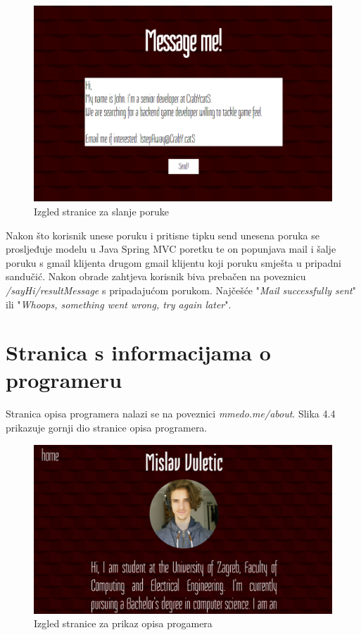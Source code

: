 \documentclass[times, utf8, zavrsni, numeric]{fer}
\begin{document}
\begin{figure}[htb]
				\centering
				\includegraphics[width=14.6cm]{images/message.png}
				\caption{Izgled stranice za slanje poruke}
				\label{fig:message}
\end{figure}

Nakon što korisnik unese poruku i pritisne tipku send unesena poruka se prosljeđuje modelu u Java Spring MVC poretku te on popunjava mail i šalje poruku s gmail klijenta drugom gmail klijentu koji poruku smješta u pripadni sandučić.
Nakon obrade zahtjeva korisnik biva prebačen na poveznicu \textit{/sayHi/resultMessage} s pripadajućom porukom.
Najčešće "\textit{Mail successfully sent}" ili "\textit{Whoops, something went wrong, try again later}".

\section{Stranica s informacijama o programeru}
\qquad Stranica opisa programera nalazi se na poveznici \textit{mmedo.me/about}.
Slika 4.4 prikazuje gornji dio stranice opisa programera.

\begin{figure}[htb]
				\centering
				\includegraphics[width=14.6cm]{images/about.png}
				\caption{Izgled stranice za prikaz opisa progamera}
				\label{fig:about}
\end{figure}
\end{document}
